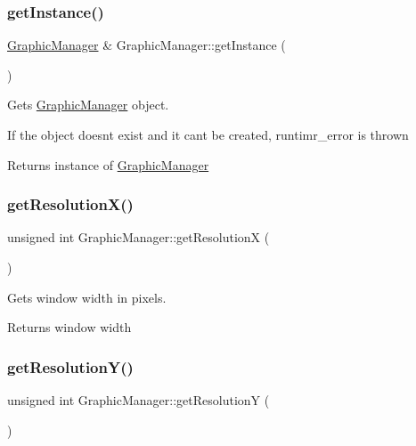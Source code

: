 \subsubsection{\texorpdfstring{get\+Instance()}{getInstance()}}
{\footnotesize\ttfamily \mbox{\hyperlink{class_graphic_manager}{Graphic\+Manager}} \& Graphic\+Manager\+::get\+Instance (\begin{DoxyParamCaption}{ }\end{DoxyParamCaption})\hspace{0.3cm}{\ttfamily [static]}}



Gets \mbox{\hyperlink{class_graphic_manager}{Graphic\+Manager}} object. 

If the object doesn\textquotesingle{}t exist and it can\textquotesingle{}t be created, runtimr\+\_\+error is thrown \begin{DoxyReturn}{Returns}
instance of \mbox{\hyperlink{class_graphic_manager}{Graphic\+Manager}} 
\end{DoxyReturn}
\mbox{\label{class_graphic_manager_a59523c70187862b7ccd0fd73b65cbbf0}} 
\subsubsection{\texorpdfstring{get\+Resolution\+X()}{getResolutionX()}}
{\footnotesize\ttfamily unsigned int Graphic\+Manager\+::get\+ResolutionX (\begin{DoxyParamCaption}{ }\end{DoxyParamCaption})}



Gets window width in pixels. 

\begin{DoxyReturn}{Returns}
window width 
\end{DoxyReturn}
\mbox{\label{class_graphic_manager_a8c9a8735220370a81101d32c73595bc3}} 
\subsubsection{\texorpdfstring{get\+Resolution\+Y()}{getResolutionY()}}
{\footnotesize\ttfamily unsigned int Graphic\+Manager\+::get\+ResolutionY (\begin{DoxyParamCaption}{ }\end{DoxyParamCaption})}



